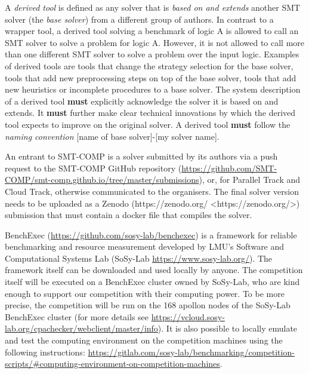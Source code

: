 \documentclass[12pt]{article}
\newcommand{\paralleltrack}{Parallel Track\xspace}
\newcommand{\cloudtrack}{Cloud Track\xspace}
\begin{document}
%
A \emph{derived tool} is defined as any solver that is \emph{based on and
extends} another SMT solver (the \emph{base solver}) from a different
group of authors.
In contrast to a wrapper tool,
a derived tool solving a benchmark of logic A is allowed to call an SMT solver
to solve a problem for logic A.
However, it is not allowed to call more than one different SMT solver to solve a problem over the input logic.
Examples of derived tools are tools that change the strategy selection for the base solver,
tools that add new preprocessing steps on top of the base solver,
tools that add new heuristics or incomplete procedures to a base solver.
The system description of a derived tool
\textbf{must} explicitly acknowledge
the solver it is based on and extends.  It \textbf{must} further make clear
technical innovations by which the derived tool expects to improve on the
original solver.  A derived tool \textbf{must} follow the \emph{naming convention}
{[name of base solver]-[my solver name]}.

%
An entrant to SMT-COMP is a solver submitted by its authors via
a push request to the SMT-COMP GitHub repository (\url{https://github.com/SMT-COMP/smt-comp.github.io/tree/master/submissions}), or, for
\paralleltrack{} and \cloudtrack{}, otherwise communicated to the
organisers. The final solver version needs to be uploaded as a Zenodo (https://zenodo.org/ <https://zenodo.org/>) submission
that must contain a docker file that compiles the solver.


%
BenchExec (\url{https://github.com/sosy-lab/benchexec}) is a framework for reliable benchmarking and resource
measurement developed by LMU's Software and Computational Systems Lab (SoSy-Lab \url{https://www.sosy-lab.org/}).
The framework itself can be downloaded and used locally by anyone.
The competition itself will be executed on a BenchExec cluster owned by SoSy-Lab,
who are kind enough to support our competition with their computing power.
To be more precise, the competition will be run on the 168 apollon nodes of the
SoSy-Lab BenchExec cluster (for more details see \url{https://vcloud.sosy-lab.org/cpachecker/webclient/master/info}).
It is also possible to locally emulate and test the computing environment on
the competition machines using the following instructions:
\url{https://gitlab.com/sosy-lab/benchmarking/competition-scripts/#computing-environment-on-competition-machines}.
\end{document}
